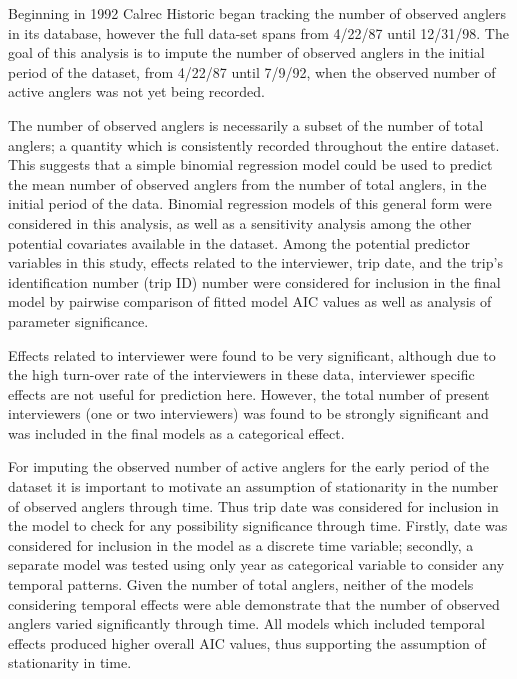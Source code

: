 \documentclass[12pt,]{article}
\begin{document}
\renewcommand{\thepage}{E-\arabic{page}}
\renewcommand{\thefigure}{E\arabic{figure}}
\renewcommand{\thetable}{E\arabic{table}}

\setcounter{page}{1} \setcounter{figure}{1} \setcounter{table}{1}

Beginning in 1992 Calrec Historic began tracking the number of observed
anglers in its database, however the full data-set spans from 4/22/87
until 12/31/98. The goal of this analysis is to impute the number of
observed anglers in the initial period of the dataset, from 4/22/87
until 7/9/92, when the observed number of active anglers was not yet
being recorded.

The number of observed anglers is necessarily a subset of the number of
total anglers; a quantity which is consistently recorded throughout the
entire dataset. This suggests that a simple binomial regression model
could be used to predict the mean number of observed anglers from the
number of total anglers, in the initial period of the data. Binomial
regression models of this general form were considered in this analysis,
as well as a sensitivity analysis among the other potential covariates
available in the dataset. Among the potential predictor variables in
this study, effects related to the interviewer, trip date, and the
trip's identification number (trip ID) number were considered for
inclusion in the final model by pairwise comparison of fitted model AIC
values as well as analysis of parameter significance.

Effects related to interviewer were found to be very significant,
although due to the high turn-over rate of the interviewers in these
data, interviewer specific effects are not useful for prediction here.
However, the total number of present interviewers (one or two
interviewers) was found to be strongly significant and was included in
the final models as a categorical effect.

For imputing the observed number of active anglers for the early period
of the dataset it is important to motivate an assumption of stationarity
in the number of observed anglers through time. Thus trip date was
considered for inclusion in the model to check for any possibility
significance through time. Firstly, date was considered for inclusion in
the model as a discrete time variable; secondly, a separate model was
tested using only year as categorical variable to consider any temporal
patterns. Given the number of total anglers, neither of the models
considering temporal effects were able demonstrate that the number of
observed anglers varied significantly through time. All models which
included temporal effects produced higher overall AIC values, thus
supporting the assumption of stationarity in time.
\end{document}
